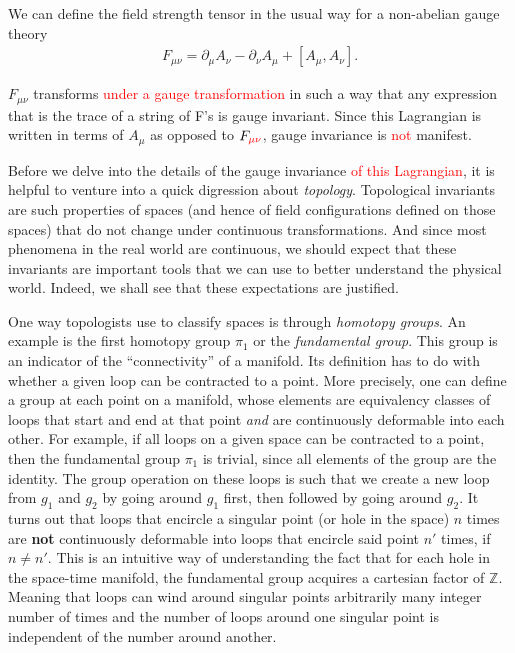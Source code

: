 We can define the field strength tensor in the usual way for a non-abelian gauge theory
\begin{align}
    F_{\mu \nu} = \partial_{\mu}A_{\nu} - \partial_{\nu} A_{\mu} + [A_{\mu}, A_{\nu}].
\end{align}




    $F_{\mu \nu}$ transforms \textcolor{red}{under a gauge transformation} in such a way that any expression that is the trace of a string of F's is gauge invariant. Since this Lagrangian is written in terms of $A_{\mu}$ as opposed to $F_{\textcolor{red}{\mu \nu}}$, gauge invariance is \textcolor{red}{not} manifest.

    Before we delve into the details of the gauge invariance \textcolor{red}{of this Lagrangian}, it is helpful to venture into a quick digression about \textit{topology}. Topological invariants are such properties of spaces (and hence of field configurations defined on those spaces) that do not change under continuous transformations. And since most phenomena in the real world are continuous, we should expect that these invariants are important tools that we can use to better understand the physical world. Indeed, we shall see that these expectations are justified. 

    One way topologists use to classify spaces is through \textit{homotopy groups}. An example is the first homotopy group $\pi_1$ or the \textit{fundamental group}. This group is an indicator of the ``connectivity'' of a manifold. Its definition has to do with whether a given loop can be contracted to a point. More precisely, one can define a group at each point on a manifold, whose elements are equivalency classes of loops that start and end at that point \textit{and} are continuously deformable into each other. For example, if all loops on a given space can be contracted to a point, then the fundamental group $\pi_1$ is trivial, since all elements of the group are the identity. The group operation on these loops is such that we create a new loop from $g_1$ and $g_2$ by going around $g_1$ first, then followed by going around $g_2$. It turns out that loops that encircle a singular point (or hole in the space) $n$ times are \textbf{not} continuously deformable into loops that encircle said point $n'$ times, if $n \neq n'$. This is an intuitive way of understanding the fact that for each hole in the space-time manifold, the fundamental group acquires a cartesian factor of $\mathbb{Z}$. Meaning that loops can wind around singular points arbitrarily many integer number of times and the number of loops around one singular point is independent of the number around another.


